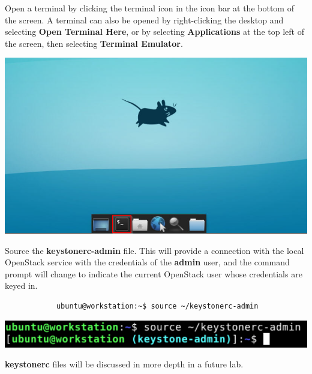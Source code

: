 \documentclass[letterpaper, 12pt]{article}
\begin{document}
\begin{enumerate}
    \begin{labstep}
        Open a terminal by clicking the terminal icon in the icon bar at the bottom of the screen.
        A terminal can also be opened by right-clicking the desktop and selecting \textbf{Open Terminal Here}, or by selecting \textbf{Applications} at the top left of the screen, then selecting \textbf{Terminal Emulator}.

        \begin{center}
            \includegraphics[width=\linewidth]{images/part2/step1.png}
        \end{center}
    \end{labstep}

    \begin{labstep}
        Source the \textbf{keystonerc-admin} file.
        This will provide a connection with the local OpenStack service with the credentials of the \textbf{admin} user, and the command prompt will change to indicate the current OpenStack user whose credentials are keyed in.
        \begin{lstlisting}
            ubuntu@workstation:~$ source ~/keystonerc-admin
        \end{lstlisting}

        \begin{center}
            \includegraphics[width=\linewidth]{images/part2/step2.png}
        \end{center}
    \end{labstep}

    \begin{notebox}
        \textbf{keystonerc} files will be discussed in more depth in a future lab.
    \end{notebox}


\end{enumerate}
\end{document}
